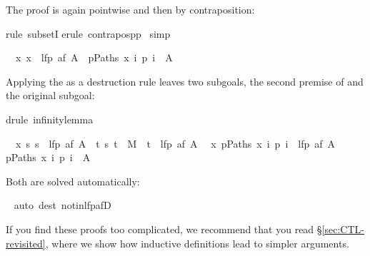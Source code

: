 \begin{isabellebody}
%
\begin{isamarkuptxt}%
\noindent
The proof is again pointwise and then by contraposition:%
\end{isamarkuptxt}%
\isamarkuptrue%
rule\ subsetI{\isacharparenright}\isanewline
\isamarkupfalse%
erule\ contrapos{\isacharunderscore}pp{\isacharparenright}\isanewline
\isamarkupfalse%
\ simp\isamarkupfalse%
%
\begin{isamarkuptxt}%
\begin{isabelle}%
\ {}{\isachardot}\ {\isasymAnd}x{\isachardot}\ x\ {\isasymnotin}\ lfp\ {\isacharparenleft}af\ A{\isacharparenright}\ {\isasymLongrightarrow}\ {\isasymexists}p{\isasymin}Paths\ x{\isachardot}\ {\isasymforall}i{\isachardot}\ p\ i\ {\isasymnotin}\ A%
\end{isabelle}
Applying the  as a destruction rule leaves two subgoals, the second
premise of  and the original subgoal:%
\end{isamarkuptxt}%
\isamarkuptrue%
drule\ infinity{\isacharunderscore}lemma{\isacharparenright}\isamarkupfalse%
%
\begin{isamarkuptxt}%
\begin{isabelle}%
\ {}{\isachardot}\ {\isasymAnd}x{\isachardot}\ {\isasymforall}s{\isachardot}\ s\ {\isasymnotin}\ lfp\ {\isacharparenleft}af\ A{\isacharparenright}\ {\isasymlongrightarrow}\ {\isacharparenleft}{\isasymexists}t{\isachardot}\ {\isacharparenleft}s{\isacharcomma}\ t{\isacharparenright}\ {\isasymin}\ M\ {\isasymand}\ t\ {\isasymnotin}\ lfp\ {\isacharparenleft}af\ A{\isacharparenright}{\isacharparenright}\isanewline
\ {}{\isachardot}\ {\isasymAnd}x{\isachardot}\ {\isasymexists}p{\isasymin}Paths\ x{\isachardot}\ {\isasymforall}i{\isachardot}\ p\ i\ {\isasymnotin}\ lfp\ {\isacharparenleft}af\ A{\isacharparenright}\ {\isasymLongrightarrow}\isanewline
{}p{\isasymin}Paths\ x{\isachardot}\ {\isasymforall}i{\isachardot}\ p\ i\ {\isasymnotin}\ A%
\end{isabelle}
Both are solved automatically:%
\end{isamarkuptxt}%
\ \isamarkuptrue%
auto\ dest{\isacharcolon}\ not{\isacharunderscore}in{\isacharunderscore}lfp{\isacharunderscore}afD{\isacharparenright}\isanewline
\isamarkupfalse%
\isamarkupfalse%
%
\begin{isamarkuptext}%
If you find these proofs too complicated, we recommend that you read
\S\ref{sec:CTL-revisited}, where we show how inductive definitions lead to
simpler arguments.


\end{isamarkuptext}
\end{isabellebody}
